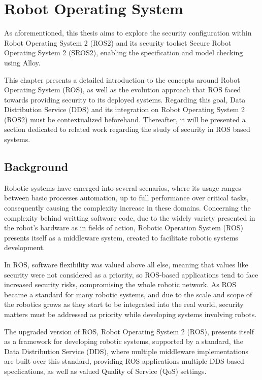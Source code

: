 \chapter{Robot Operating System}\label{c:ros}

As aforementioned, this thesis aims to explore the security configuration within Robot Operating System 2 (ROS2) and its security toolset Secure Robot Operating System 2 (SROS2), enabling the specification and model checking using Alloy. 

This chapter presents a detailed introduction to the concepts around Robot Operating System (ROS), as well as the evolution approach that ROS faced towards providing security to its deployed systems. Regarding this goal, Data Distribution Service (DDS) and its integration on Robot Operating System 2 (ROS2) must be contextualized beforehand. Thereafter, it will be presented a section dedicated to related work regarding the study of security in ROS based systems.

\section{Background}\label{s:ros-back}

Robotic systems have emerged into several scenarios, where its usage ranges between basic processes automation, up to full performance over critical tasks, consequently causing the complexity increase in these domains. Concerning the complexity behind writting software code, due to the widely variety presented in the robot's hardware as in fields of action, Robotic Operation System (ROS) presents itself as a middleware system, created to facilitate robotic systems development.

In ROS, software flexibility was valued above all else, meaning that values like security were not considered as a priority, so ROS-based applications tend to face increased security risks, compromising the whole robotic network. As ROS became a standard for many robotic systems, and due to the scale and scope of the robotics grows as they start to be integrated into the real world, security matters must be addressed as priority while developing systems involving robots. \cite{diluoffo2018robot, kim2018security}

The upgraded version of ROS, Robot Operating System 2 (ROS), presents itself as a framework for developing robotic systems, supported by a standard, the Data Distribution Service (DDS), where multiple middleware implementations are built over this standard, providing ROS applications multiple DDS-based specfications, as well as valued Quality of Service (QoS) settings. 

